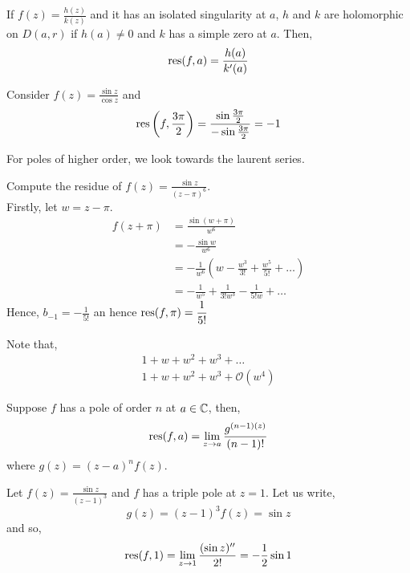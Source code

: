 \documentclass{article}
\begin{document}
\begin{nlemma}
  If $\displaystyle{f(z) = \frac{h(z)}{k(z)}}$ and it has an isolated singularity at $a$, $h$ and $k$ are holomorphic on $D(a, r)$ if $h(a) \ne 0$ and $k$ has a simple zero at $a$. Then,
  $$ \operatorname*{res} (f, a) = \frac{h(a)}{k'(a)} $$
\end{nlemma}

\begin{eg}
  Consider $\displaystyle{f(z) = \frac{\sin z}{\cos z}}$ and
  $$ \operatorname*{res} \left(f, \frac{3\pi}{2}\right) = \frac{\sin \frac{3\pi}{2}}{-\sin \frac{3\pi}{2}} = -1 $$
\end{eg}

For poles of higher order, we look towards the laurent series.

\begin{eg}
  Compute the residue of $\displaystyle{f(z) = \frac{\sin z}{(z - \pi)^6}}$. \\
  Firstly, let $w = z - \pi$.
  \begin{align*}
    f(z + \pi) &= \frac{\sin(w + \pi)}{w^6}\\
    &= -\frac{\sin w}{w^6}\\
    &= -\frac{1}{w^6}\left( w - \frac{w^3}{3!} + \frac{w^5}{5!} + \dots \right)\\
    &= - \frac{1}{w^5} + \frac{1}{3!w^3} - \frac{1}{5!w} + \dots
  \end{align*}
  Hence, $\displaystyle{b_{-1} = -\frac{1}{5!}}$ an hence $\displaystyle{\operatorname*{res}(f, \pi) = \frac{1}{5!}}$
\end{eg}


\begin{notation}
  Note that,
  \begin{align*}
    1 + w + w^2 + w^3 + \dots \\
    1 + w + w^2 + w^3 + \mathcal{O}(w^4)
  \end{align*}
\end{notation}


\begin{nprop}
  Suppose $f$ has a pole of order $n$ at $a \in \mathbb{C}$, then,
  $$ \operatorname*{res} (f, a) = \lim_{z \to a} \frac{g^{(n-1)(z)}}{(n-1)!} $$
  where $g(z) = (z - a)^n f(z)$.
\end{nprop}

\begin{eg}
  Let $\displaystyle{f(z) = \frac{\sin z}{(z- 1)^3}}$ and $f$ has a triple pole at $z = 1$. Let us write,
  $$ g(z) = (z - 1)^3f(z) = \sin z $$
  and so,
  $$ \operatorname*{res} (f, 1) = \lim_{z \to 1} \frac{(\sin z)''}{2!} = -\frac{1}{2}\sin 1 $$
\end{eg}
\end{document}
